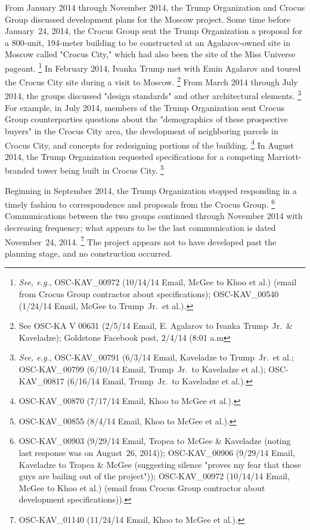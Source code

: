 From January 2014 through November 2014, the Trump Organization and Crocus Group discussed development plans for the Moscow project.
Some time before January~24, 2014, the Crocus Group sent the Trump Organization a proposal for a 800-unit, 194-meter building to be constructed at an Agalarov-owned site in Moscow called "Crocus City," which had also been the site of the Miss Universe pageant.%
\footnote{\textit{See, e.g.}, OSC-KAV\_00972 (10/14/14 Email, McGee to Khoo et al.) (email from Crocus Group contractor about specifications); OSC-KAV\_00540 (1/24/14 Email, McGee to Trump~Jr.\ et al.).}
In February 2014, Ivanka Trump met with Emin Agalarov and toured the Crocus City site during a visit to Moscow.%
\footnote{See OSC-KA V 00631 (2/5/14 Email, E. Agalarov to Ivanka Trump~Jr.\ \& Kaveladze); Goldstone Facebook post, 2/4/14 (8:01 a.m} 
From March 2014 through July 2014, the groups discussed "design standards" and other architectural elements.%
\footnote{\textit{See, e.g.}, OSC-KAV\_00791 (6/3/14 Email, Kaveladze to Trump~Jr.\ et al.; OSC-KAV\_00799 (6/10/14 Email, Trump~Jr.\ to Kaveladze et al.); OSC-KAV\_00817 (6/16/14 Email, Trump~Jr.\ to Kaveladze et al.).}
For example, in July 2014, members of the Trump Organization sent Crocus Group counterparties questions about the "demographics of these prospective buyers" in the Crocus City area, the development of neighboring parcels in Crocus City, and concepts for redesigning portions of the building.%
\footnote{OSC-KAV\_00870 (7/17/14 Email, Khoo to McGee et al.).}
In August 2014, the Trump Organization requested specifications for a competing Marriott-branded tower being built in Crocus City.%
\footnote{OSC-KAV\_00855 (8/4/14 Email, Khoo to McGee et al.).}

Beginning in September 2014, the Trump Organization stopped responding in a timely fashion to correspondence and proposals from the Crocus Group.%
\footnote{OSC-KAV\_00903 (9/29/14 Email, Tropea to McGee \& Kaveladze (noting last response was on August~26, 2014)); OSC-KAV\_00906 (9/29/14 Email, Kaveladze to Tropea \& McGee (suggesting silence "proves my fear that those guys are bailing out of the project")); OSC-KAV\_00972 (10/14/14 Email, McGee to Khoo et al.) (email from Crocus Group contractor about development specifications)).}
Communications between the two groups continued through November 2014 with decreasing frequency; what appears to be the last communication is dated November~24, 2014.%
\footnote{OSC-KAV\_01140 (11/24/14 Email, Khoo to McGee et al.).}
The project appears not to have developed past the planning stage, and no construction occurred.

